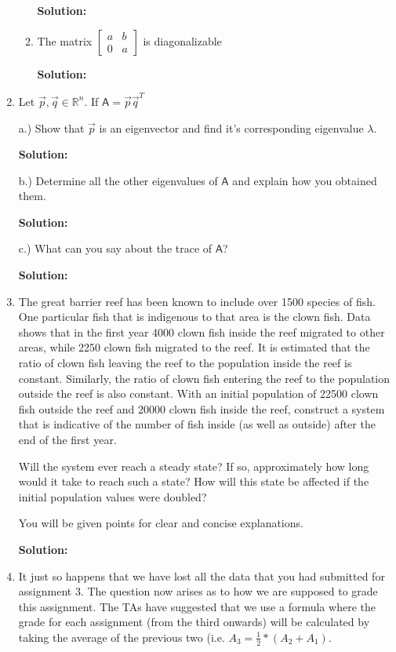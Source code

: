 \documentclass[a4paper, 11pt]{article}
\newcommand{\mat}[1]{\boldsymbol { \mathsf{#1}} }
\begin{document}
\begin{enumerate}
\begin{enumerate}
\textbf{Solution:}

    \item The matrix 
        $\begin{bmatrix}
        a & b \\
        0 & a
        \end{bmatrix}$ is diagonalizable 

	\textbf{Solution:}
\end{enumerate}        

\item Let $ \Vec{p}, \Vec{q} \in \mathbb R^{n}$. If $ \mat{A} = \Vec{p} \Vec{q}^{T}$


a.) Show that $\Vec{p}$ is an eigenvector and find it's corresponding eigenvalue $\lambda$. 

\textbf{Solution:}

b.) Determine all the other eigenvalues of $\mat{A}$ and explain how you obtained them.

\textbf{Solution:}

c.) What can you say about the trace of $\mat{A}$?

\textbf{Solution:}

\item The great barrier reef has been known to include over 1500 species of fish. One particular fish that is indigenous to that area is the clown fish. Data shows that in the first year 4000 clown fish inside the reef migrated to other areas, while 2250 clown fish migrated to the reef. It is estimated that the ratio of clown fish leaving the reef to the population inside the reef is constant. Similarly, the ratio of clown fish entering the reef to the population outside the reef is also constant. With an initial population of 22500 clown fish outside the reef and 20000 clown fish inside the reef, construct a system that is indicative of the number of fish inside (as well as outside) after the end of the first year. 

Will the system ever reach a steady state? If so, approximately how long would it take to reach such a state? How will this state be affected if the initial population values were doubled? 

You will be given points for clear and concise explanations.

\textbf{Solution:}


\item It just so happens that we have lost all the data that you had submitted for assignment 3. The question now arises as to how we are supposed to grade this assignment. The TAs have suggested that we use a formula where the grade for each assignment (from the third onwards) will be calculated by taking the average of the previous two (i.e. $A_3 = \frac{1}{2}*(A_2+A_1) $.  


\end{enumerate}
\end{document}
